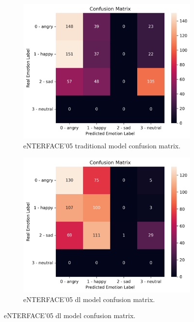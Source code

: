 \begin{figure}
	\centering
	\begin{subfigure}{.5\textwidth}
		\centering
		\includegraphics[width=\linewidth]{figs/4_5_discussion/ent_trad_cm.png}
		\caption{eNTERFACE'05 traditional model confusion matrix.}
	\end{subfigure}%
	\begin{subfigure}{.5\textwidth}
		\centering
		\includegraphics[width=\linewidth]{figs/4_5_discussion/ent_deep_cm.png}
		\caption{eNTERFACE'05 \ac{dl} model confusion matrix.}
	\end{subfigure}

\end{figure}
